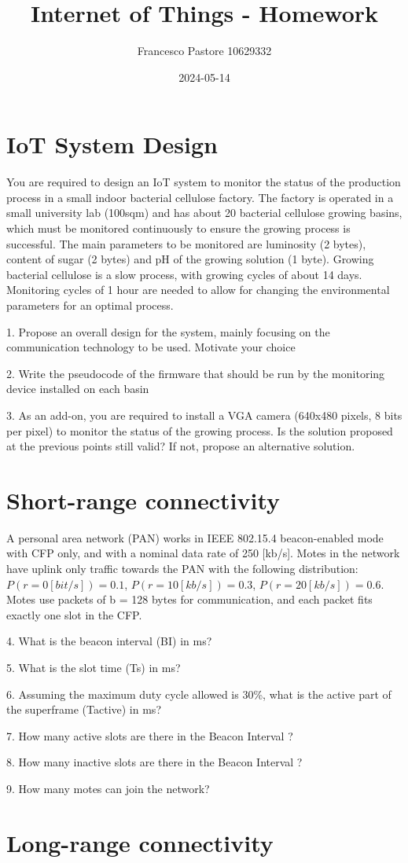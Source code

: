 \documentclass[12pt]{article}
\title{Internet of Things - Homework}
\author{Francesco Pastore 10629332}
\date{2024-05-14}
\begin{document}
\maketitle

\section{IoT System Design}

You are required to design an IoT system to monitor the status of the production process in a small indoor bacterial cellulose factory.
The factory is operated in a small university lab (100sqm) and has about 20 bacterial cellulose growing basins, which must be monitored continuously to ensure the growing process is successful.
The main parameters to be monitored are luminosity (2 bytes), content of sugar (2 bytes) and pH of the growing solution (1 byte).
Growing bacterial cellulose is a slow process, with growing cycles of about 14 days.
Monitoring cycles of 1 hour are needed to allow for changing the environmental parameters for an optimal process.

1. Propose an overall design for the system, mainly focusing on the communication technology to be used. Motivate your choice

2. Write the pseudocode of the firmware that should be run by the monitoring device installed on each basin

3. As an add-on, you are required to install a VGA camera (640x480 pixels, 8 bits per pixel) to monitor the status of the growing process. Is the solution proposed at the previous points still valid? If not, propose an alternative solution.

\newpage

\section{Short-range connectivity}

A personal area network (PAN)  works in IEEE 802.15.4 beacon-enabled mode with CFP only, and with a nominal data rate of 250 [kb/s].
Motes in the network have uplink only traffic towards the PAN with the following distribution: $P(r=0 [bit/s])=0.1$, $P(r=10 [kb/s])=0.3$, $P(r=20 [kb/s])=0.6$.
Motes use packets of b = 128 bytes for communication, and each packet fits exactly one slot in the CFP.

4. What is the beacon interval (BI) in ms?

5. What is the slot time (Ts) in ms?

6. Assuming the maximum duty cycle allowed is 30\%, what is the active part of the superframe (Tactive) in ms?

7. How many active slots are there in the Beacon Interval ?

8. How many inactive slots are there in the Beacon Interval ?

9. How many motes can join the network?

\newpage

\section{Long-range connectivity}
\end{document}
